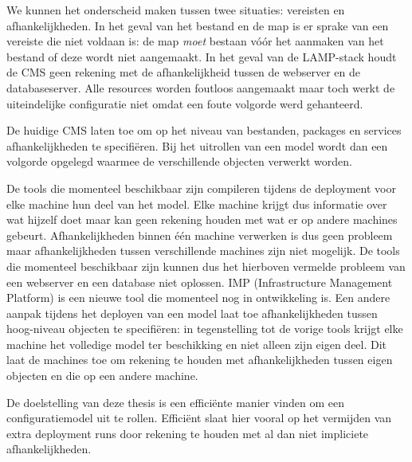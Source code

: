 We kunnen het onderscheid maken tussen twee situaties: vereisten en afhankelijkheden.
In het geval van het bestand en de map is er sprake van een vereiste die niet voldaan is: de map \emph{moet} bestaan v\'o\'or het aanmaken van het bestand of deze wordt niet aangemaakt.
In het geval van de LAMP-stack houdt de CMS geen rekening met de afhankelijkheid tussen de webserver en de databaseserver.
Alle resources worden foutloos aangemaakt maar toch werkt de uiteindelijke configuratie niet omdat een foute volgorde werd gehanteerd.


De huidige CMS laten toe om op het niveau van bestanden, packages en services afhankelijkheden te specifi\"eren.
Bij het uitrollen van een model wordt dan een volgorde opgelegd waarmee de verschillende objecten verwerkt worden.

De tools die momenteel beschikbaar zijn compileren tijdens de deployment voor elke machine hun deel van het model.
Elke machine krijgt dus informatie over wat hijzelf doet maar kan geen rekening houden met wat er op andere machines gebeurt.
Afhankelijkheden binnen \'e\'en machine verwerken is dus geen probleem maar afhankelijkheden tussen verschillende machines zijn niet mogelijk. 
De tools die momenteel beschikbaar zijn kunnen dus het hierboven vermelde probleem van een webserver en een database niet oplossen.
IMP (Infrastructure Management Platform) is een nieuwe tool die momenteel nog in ontwikkeling is.
Een andere aanpak tijdens het deployen van een model laat toe afhankelijkheden tussen hoog-niveau objecten te specifi\"eren:
in tegenstelling tot de vorige tools krijgt elke machine het volledige model ter beschikking en niet alleen zijn eigen deel.
Dit laat de machines toe om rekening te houden met afhankelijkheden tussen eigen objecten en die op een andere machine.

De doelstelling van deze thesis is een effici\"ente manier vinden om een configuratiemodel uit te rollen.
Effici\"ent slaat hier vooral op het vermijden van extra deployment runs door rekening te houden met al dan niet impliciete afhankelijkheden.

